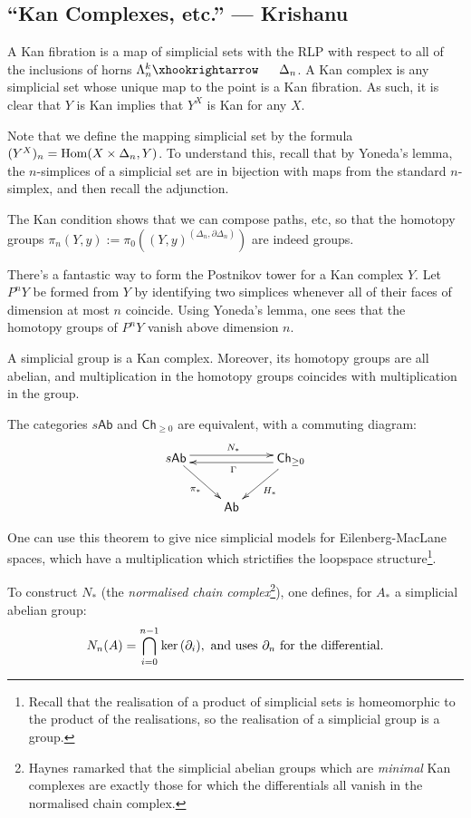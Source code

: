 \documentclass[11pt]{article}
\newcommand{\KanSemResponse}[1]
{
\thispagestyle{fancy}
\section{#1}
}
\begin{document}
\begin{KrishanuKanComplexes}
\KanSemResponse
{``Kan Complexes, etc.'' --- Krishanu}
A Kan fibration is a map of simplicial sets with the RLP with respect to all of the inclusions of horns $\Lambda_n^k\cofibration \Delta_n$. A Kan complex is any simplicial set whose unique map to the point is a Kan fibration. As such, it is clear that $Y$ is Kan implies that $Y^X$ is Kan for any $X$.

Note that we define the mapping simplicial set by the formula $(Y^X)_n=\Hom(X\times\Delta_n,Y)$. To understand this, recall that by Yoneda's lemma, the $n$-simplices of a simplicial set are in bijection with maps from the standard $n$-simplex, and then recall the adjunction.

The Kan condition shows that we can compose paths, etc, so that the homotopy groups $\pi_n(Y,y):=\pi_0((Y,y)^{(\Delta_n,\partial\Delta_n)})$ are indeed groups.

There's a fantastic way to form the Postnikov tower for a Kan complex $Y$. Let $P^n Y$ be formed from $Y$ by identifying two simplices whenever all of their faces of dimension at most $n$ coincide. Using Yoneda's lemma, one sees that the homotopy groups of $P^nY$ vanish above dimension $n$.

\begin{prop*}
A simplicial group is a Kan complex. Moreover, its homotopy groups are all abelian, and multiplication in the homotopy groups coincides with multiplication in the group.
\end{prop*}
\begin{thm*}
The categories $s\mathsf{Ab}$ and $\mathsf{Ch}_{\geq0}$ are equivalent, with a commuting diagram:
\[\xymatrix{
\ar[rd]_{\pi_*}s\mathsf{Ab} \ar@<.1cm>[rr]^{N_*}&&
\mathsf{Ch}_{\geq0}\ar@<1mm>[ll]^\Gamma \ar[ld]^{H_*}\\
&\mathsf{Ab}
}\]
\end{thm*}
\noindent One can use this theorem to give nice simplicial models for Eilenberg-MacLane spaces, which have a multiplication which strictifies the loopspace structure\footnote{Recall that the realisation of a product of simplicial sets is homeomorphic to the product of the realisations, so the realisation of a simplicial group is a group.}.

To construct $N_*$ (the \emph{normalised chain complex}\footnote{Haynes ramarked that the simplicial abelian groups which are \emph{minimal} Kan complexes are exactly those for which the differentials all vanish in the normalised chain complex.}), one defines, for $A_*$ a simplicial abelian group:
\[N_n(A)= \bigcap_{i=0}^{n-1}\ker(\partial_i),\textup{ and uses $\partial_n$ for the differential.}\]


\pagebreak
\end{KrishanuKanComplexes}
\end{document}

